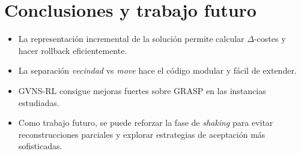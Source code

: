 \documentclass[12pt, a4paper]{report}
\begin{document}
\chapter{Conclusiones y trabajo futuro}

\begin{itemize}
  \item La representación incremental de la solución permite calcular $\Delta$-costes y hacer rollback eficientemente.
  \item La separación \emph{vecindad} vs \emph{move} hace el código modular y fácil de extender.
  \item GVNS-RL consigue mejoras fuertes sobre GRASP en las instancias estudiadas.
  \item Como trabajo futuro, se puede reforzar la fase de \emph{shaking} para evitar reconstrucciones parciales y explorar estrategias de aceptación más sofisticadas.
\end{itemize}

\printbibliography[heading=bibintoc, title={Bibliografía}]
\end{document}
